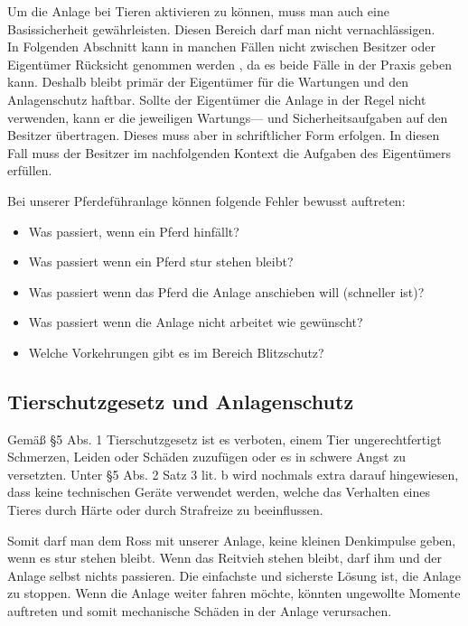 Um die Anlage bei Tieren aktivieren zu können, muss man auch eine Basissicherheit gewährleisten.
Diesen Bereich darf man nicht vernachlässigen. \\ In Folgenden Abschnitt  kann in manchen Fällen nicht zwischen Besitzer oder Eigentümer Rücksicht genommen werden , da es beide Fälle in der Praxis geben kann. Deshalb bleibt primär der Eigentümer für die Wartungen und den Anlagenschutz haftbar. Sollte der Eigentümer die Anlage in der Regel nicht verwenden, kann er die jeweiligen Wartungs--- und Sicherheitsaufgaben auf den Besitzer übertragen. Dieses muss aber in schriftlicher Form erfolgen. In diesen Fall muss der Besitzer im nachfolgenden Kontext die Aufgaben des Eigentümers erfüllen.

Bei unserer Pferdeführanlage können folgende Fehler bewusst auftreten:

\begin{itemize}
\item{Was passiert, wenn ein Pferd hinfällt?}
\item{Was passiert wenn ein Pferd stur stehen bleibt?}
\item{Was passiert wenn das Pferd die Anlage anschieben will (schneller ist)?}
\item{Was passiert wenn die Anlage nicht arbeitet wie gewünscht?}
\item{Welche Vorkehrungen gibt es im Bereich Blitzschutz?}
\end{itemize}

\subsection{Tierschutzgesetz und Anlagenschutz}
\label{sec:tierschutzgesetzUndAnlagenschutz}

Gemäß §5 Abs. 1 Tierschutzgesetz ist es verboten, 
einem Tier ungerechtfertigt Schmerzen, Leiden oder Schäden zuzufügen oder es in schwere Angst zu versetzten. 
Unter §5 Abs. 2 Satz 3 lit. b wird nochmals extra darauf hingewiesen, dass keine technischen Geräte verwendet werden, welche das Verhalten eines Tieres durch Härte oder durch Strafreize zu beeinflussen. 

Somit darf man dem Ross mit unserer Anlage, keine kleinen Denkimpulse geben, wenn es stur stehen bleibt. Wenn das Reitvieh stehen bleibt, darf ihm und der Anlage selbst nichts passieren. Die einfachste und sicherste Lösung ist, die Anlage zu stoppen. Wenn die Anlage weiter fahren möchte, könnten ungewollte Momente auftreten und somit mechanische Schäden in der Anlage verursachen.

